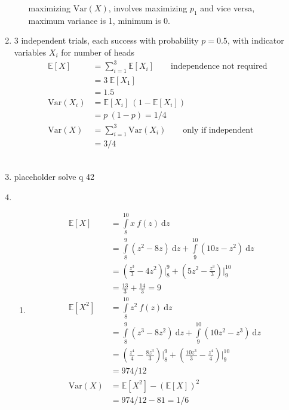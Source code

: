 \begin{enumerate}
\begin{enumerate}
			maximizing $ \mathrm{Var}(X) $, involves maximizing $ p_1 $ and vice versa, \\
			maximum variance is 1, minimum is 0. \\
			
		\end{enumerate}
	
	
	\item $ 3 $ independent trials, each success with probability $ p = 0.5 $, with indicator variables $ X_i $ for number of heads \\
	
		\begin{align}
			\mathbb{E}[X] &= \sum\limits_{i = 1}^{3} \mathbb{E}[X_i] \qquad \text{independence not required} \nonumber \\
			&= 3\ \mathbb{E}[X_1] \nonumber \\
			&= 1.5   \\
			\mathrm{Var}(X_i) &= \mathbb{E}[X_i]\ (1 - \mathbb{E}[X_i]) \nonumber \\
			&= p\ (1 - p) = 1/4 \nonumber \\
			\mathrm{Var}(X) &= \sum\limits_{i = 1}^{3} \mathrm{Var}(X_i) \qquad \text{only if independent} \nonumber \\
			&= 3/4
		\end{align} \\
	
	
	\item placeholder solve q 42 \\
	
	\item 
		\begin{enumerate}
			
			\item \begin{align}
				\mathbb{E}[X] &= \int\limits_{8}^{10} x\ f(z)\ \mathrm{d}z \nonumber \\
				&= \int\limits_{8}^{9} (z^2-8z)\ \mathrm{d}z  + \int\limits_{9}^{10} (10z-z^2)\ \mathrm{d}z\nonumber \\
				&= \left(\frac{z^3}{3} - 4z^2\right) \Big|_8^9  + \left(5z^2 - \frac{z^3}{3}\right) \Big|_9^{10} \\
				&= \frac{13}{3} + \frac{14}{3} = 9 \\
				\mathbb{E}[X^2] &= \int\limits_{8}^{10} z^2\ f(z)\ \mathrm{d}z \nonumber \\
				&= \int\limits_{8}^{9} (z^3-8z^2)\ \mathrm{d}z  + \int\limits_{9}^{10} (10z^2-z^3)\ \mathrm{d}z\nonumber \\
				&= \left(\frac{z^4}{4} - \frac{8z^3}{3}\right) \Big|_8^9  + \left(\frac{10z^3}{3} - \frac{z^4}{4}\right) \Big|_9^{10} \\
				&= 974/12 \\
				\mathrm{Var}(X) &= \mathbb{E}[X^2]- (\mathbb{E}[X])^2 \nonumber \\
				&= 974/12 - 81 = 1/6 \\
			\end{align} \\
			

\end{enumerate}
\end{enumerate}
